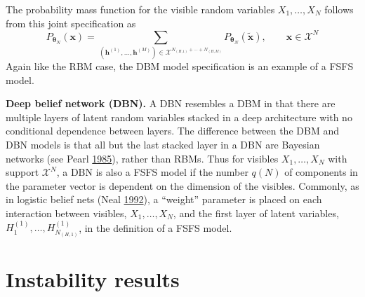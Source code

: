 \documentclass[12pt]{article}
\theoremstyle{definition}
\begin{document}
The probability mass function for the visible random variables
\(X_1, \dots, X_N\) follows from this joint specification as \[
P_{\boldsymbol \theta_N} (\boldsymbol x) = \sum\limits_{(\boldsymbol h^{(1)}, \dots, \boldsymbol h^{(M)}) \in \mathcal{X}^{N_{(H,1)} + \cdots + N_{(H,M)}}} P_{\boldsymbol \theta_N} (\tilde{\boldsymbol x}), \qquad \boldsymbol x \in \mathcal{X}^N
\] Again like the RBM case, the DBM model specification is an example of
a FSFS model.

\textbf{Deep belief network (DBN).} A DBN resembles a DBM in that there
are multiple layers of latent random variables stacked in a deep
architecture with no conditional dependence between layers. The
difference between the DBM and DBN models is that all but the last
stacked layer in a DBN are Bayesian networks (see Pearl
\protect\hyperlink{ref-pearl985bayesian}{1985}), rather than RBMs. Thus
for visibles \(X_1, \dots, X_N\) with support \(\mathcal{X}^N\), a DBN
is also a FSFS model if the number \(q(N)\) of components in the
parameter vector is dependent on the dimension of the visibles.
Commonly, as in logistic belief nets (Neal
\protect\hyperlink{ref-neal1992connectionist}{1992}), a ``weight''
parameter is placed on each interaction between visibles,
\(X_1, \dots, X_N\), and the first layer of latent variables,
\(H^{(1)}_1, \dots, H^{(1)}_{N_{(H,1)}}\), in the definition of a FSFS
model.

\section{Instability results}\label{instability-results}
\end{document}
